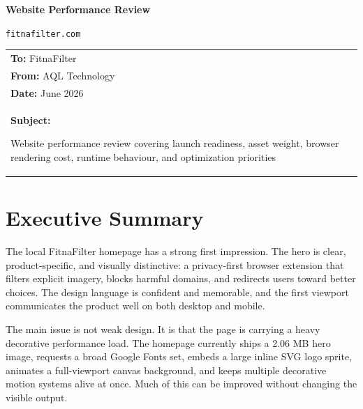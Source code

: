 \documentclass[12pt]{article}
\begin{document}

\vspace{1cm}
\begin{center}
    {\fontsize{28}{34}\selectfont\bfseries\color{primary}Website Performance Review}

    \vspace{0.7cm}
    {\fontsize{16}{20}\selectfont\color{gray}\texttt{fitnafilter.com}}

    \vspace{0.9cm}
    \begin{highlightbox}
        \begin{tabular}{l}
            \textbf{\color{primary}To:} \color{white}FitnaFilter\\[0.25cm]
            \textbf{\color{primary}From:} \color{white}AQL Technology\\[0.25cm]
            \textbf{\color{primary}Date:} \color{white}June 2026\\[0.25cm]
            \textbf{\color{primary}Subject:} \color{white}\parbox[t]{0.72\textwidth}{Website performance review covering launch readiness, asset weight, browser rendering cost, runtime behaviour, and optimization priorities}
        \end{tabular}
    \end{highlightbox}
\end{center}

\vspace{0.5cm}

\section{Executive Summary}

The local FitnaFilter homepage has a strong first impression. The hero is clear, product-specific, and visually distinctive: a privacy-first browser extension that filters explicit imagery, blocks harmful domains, and redirects users toward better choices. The design language is confident and memorable, and the first viewport communicates the product well on both desktop and mobile.

The main issue is not weak design. It is that the page is carrying a heavy decorative performance load. The homepage currently ships a 2.06 MB hero image, requests a broad Google Fonts set, embeds a large inline SVG logo sprite, animates a full-viewport canvas background, and keeps multiple decorative motion systems alive at once. Much of this can be improved without changing the visible output.
\end{document}
